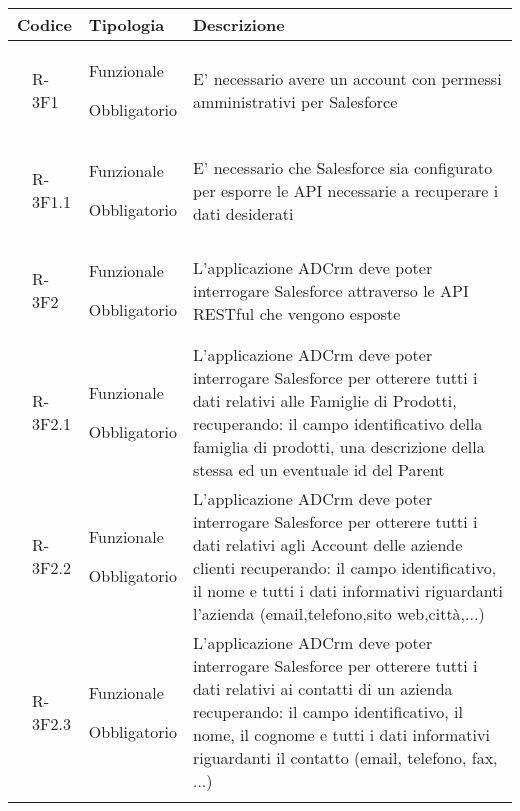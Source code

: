 \begin{longtable}{|r l|p{2.5cm}|p{10cm}|}
	\hline
	\multicolumn{2}{|c|}{\textbf{Codice}} & \textbf{Tipologia} & \textbf{Descrizione}\tabularnewline
	\hline
	& \hypertarget{R-3F1}{R-3F1} & Funzionale
	
	Obbligatorio & E' necessario avere un account con permessi amministrativi per Salesforce\tabularnewline
	\hline
	\begin{tikzpicture}

	\end{tikzpicture} & \hypertarget{R-3F1.1}{R-3F1.1} & Funzionale
	
	Obbligatorio & E' necessario che Salesforce sia configurato per esporre le API necessarie a recuperare i dati desiderati\tabularnewline
	\hline
	& \hypertarget{R-3F2}{R-3F2} & Funzionale
	
	Obbligatorio & L'applicazione ADCrm deve poter interrogare Salesforce attraverso le API RESTful che vengono esposte
	\tabularnewline
	\hline
	\begin{tikzpicture}

	\end{tikzpicture} & \hypertarget{R-3F2.1}{R-3F2.1} & Funzionale
	
	Obbligatorio & L'applicazione ADCrm deve poter interrogare Salesforce per otterere tutti i dati relativi alle Famiglie di Prodotti, recuperando: il campo identificativo della famiglia di prodotti, una descrizione della stessa ed un eventuale id del Parent\tabularnewline
	\hline
	\begin{tikzpicture}

	\end{tikzpicture} & \hypertarget{R-3F2.2}{R-3F2.2} & Funzionale
	
	Obbligatorio & L'applicazione ADCrm deve poter interrogare Salesforce per otterere tutti i dati relativi agli Account delle aziende clienti recuperando: il campo identificativo, il nome e tutti i dati informativi riguardanti l'azienda (email,telefono,sito web,città,...)\tabularnewline
	\hline
	\begin{tikzpicture}

	\end{tikzpicture} & \hypertarget{R-3F2.3}{R-3F2.3} & Funzionale
	
	Obbligatorio & L'applicazione ADCrm deve poter interrogare Salesforce per otterere tutti i dati relativi ai contatti di un azienda recuperando: il campo identificativo, il nome, il cognome e tutti i dati informativi riguardanti il contatto (email, telefono, fax, ...)\tabularnewline
	\hline
	\begin{tikzpicture}


\end{tikzpicture}
\end{longtable}
